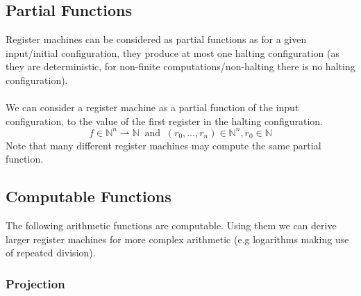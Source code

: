 \documentclass{report}
\begin{document}
\subsection*{Partial Functions}
Register machines can be considered as partial functions as for a given input/initial configuration, they produce at most one halting configuration (as they are deterministic, for non-finite computations/non-halting there is no halting configuration).
\\
\\ We can consider a register machine as a partial function of the input configuration, to the value of the first register in the halting configuration.
\[f \in \mathbb{N}^n \rightharpoonup \mathbb{N} \ \text{  and  } \ (r_0, \dots, r_n) \in \mathbb{N}^n, r_0 \in \mathbb{N}\]
Note that many different register machines may compute the same partial function.
\subsection*{Computable Functions}
The following arithmetic functions are computable. Using them we can derive larger register machines for more complex arithmetic (e.g logarithms making use of repeated division).
\subsubsection*{Projection}
\end{document}
